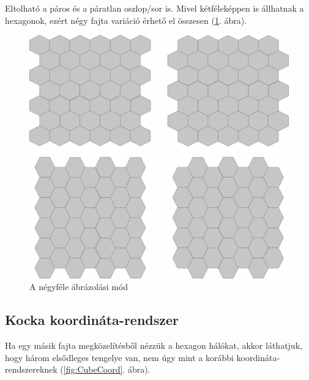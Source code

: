 Eltolható a páros és a páratlan oszlop/sor is. Mivel kétféleképpen is állhatnak a hexagonok, ezért négy fajta variáció érhető el összesen (\ref{fig:OffsetFour}. ábra).

\begin{figure}[h!]
\centering
\includegraphics[scale=0.2]{kepek/OffsetFour.jpg}
\caption{A négyféle ábrázolási mód}
\label{fig:OffsetFour}
\end{figure}

\newpage
\subsection{Kocka koordináta-rendszer}
\cite{redblobgamesHexagonalGrids}
\cite{HexagonalGrids}

Ha egy másik fajta megközelítésből nézzük a hexagon hálókat, akkor láthatjuk, hogy három elsődleges tengelye van, nem úgy mint a korábbi koordináta-rendszereknek (\ref{fig:CubeCoord}. ábra). 

